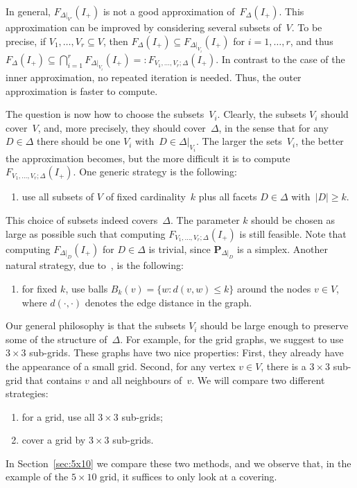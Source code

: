 \documentclass[aos,noinfoline]{imsart}
\newcommand{\face}{F}
\newcommand{\Pbf}{\mathbf{P}}
\theoremstyle{remark}
\theoremstyle{definition}
\begin{document}
\medskip%
In general, $\face_{\Delta|_{V'}}(I_{+})$ is not a good approximation of~$\face_{\Delta}(I_{+})$.  This
approximation can be improved by considering several subsets of~$V$.  To be precise, if $V_{1},\dots,V_{r}\subseteq V$, then
$\face_{\Delta}(I_{+})\subseteq\face_{\Delta|_{V_{i}}}(I_{+})$ for $i=1,\dots,r$, and thus
$\face_{\Delta}(I_{+})\subseteq\bigcap_{i=1}^{r}\face_{\Delta|_{V_{i}}}(I_{+})
=:\face_{V_{1},\dots,V_{r};\Delta}(I_{+})$.
%
In contrast to the case of the inner approximation, no repeated iteration is needed.  Thus, the outer
approximation is faster to compute.

The question is now how to choose the subsets~$V_{i}$.  Clearly, the subsets $V_{i}$ should cover~$V$, and, more
precisely, they should cover~$\Delta$, in the sense that for any~$D\in\Delta$ there should be one $V_{i}$
with~$D\in \Delta|_{V_{i}}$.  The larger the sets~$V_{i}$, the better the approximation becomes, but the more difficult it
is to compute $\face_{V_{1},\dots,V_{r};\Delta}(I_{+})$.  One generic strategy is the following:
\begin{enumerate}
\item use all subsets of $V$ of fixed cardinality~$k$ plus all facets $D\in\Delta$ with~$|D|\ge k$.
\label{strat:fixed-cardinality}
\end{enumerate}
This choice of subsets indeed covers~$\Delta$.  The parameter $k$ should be chosen as large as possible such that
computing $\face_{V_{1},\dots,V_{r};\Delta}(I_{+})$ is still feasible.  Note that computing $\face_{\Delta|_{D}}(I_{+})$
for $D\in\Delta$ is trivial, since $\Pbf_{\Delta|_{D}}$ is a simplex.  Another natural strategy, due
to~\cite{MassamWang15:local_approach}, is the following:
\begin{enumerate}[resume]
\item for fixed $k$, use balls $B_{k}(v)=\{w: d(v,w)\le k\}$ around the nodes $v\in V$, where $d(\cdot,\cdot)$ denotes
  the edge distance in the graph.
\label{strat:neighbourhoods}
\end{enumerate}

Our general philosophy is that the subsets $V_{i}$ should be large enough to preserve some of the structure
of~$\Delta$.  For example, for the grid graphs, we suggest to use $3\times3$ sub-grids.  These graphs have two nice
properties: First, they already have the appearance of a small grid.  Second, for any vertex $v\in V$, there is a
$3\times3$ sub-grid that contains $v$ and all neighbours of~$v$.  We will compare two different strategies:
\begin{enumerate}[resume]
\item for a grid, use all $3\times3$ sub-grids;
\label{strat:all-subgrids}
\item cover a grid by $3\times3$ sub-grids.
\label{strat:subgrid-cover}
\end{enumerate}
In Section~\ref{sec:5x10} we compare these two methods, and we observe that, in the example of the $5\times10$ grid, it
suffices to only look at a covering.
\end{document}
